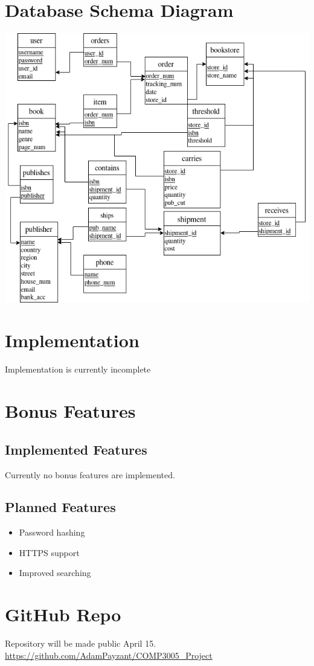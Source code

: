 \documentclass[titlepage, oneside]{article}
\begin{document}
    \section{Database Schema Diagram}
        \begin{center}
            \includegraphics[scale=.6]{images/SchemaDiagram.png}
        \end{center}
    \section{Implementation}
        Implementation is currently incomplete
    \section{Bonus Features}
        \subsection{Implemented Features}
            Currently no bonus features are implemented.
        \subsection{Planned Features}
            \begin{itemize}
                \item Password hashing
                \item HTTPS support
                \item Improved searching
            \end{itemize}
    \section{GitHub Repo}
        Repository will be made public April 15. \\
        \url{https://github.com/AdamPayzant/COMP3005_Project}
\end{document}
